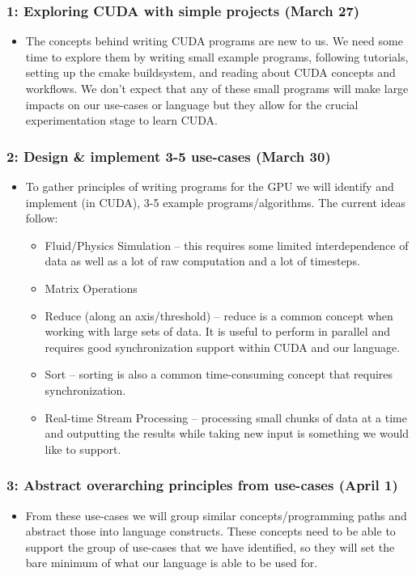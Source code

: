 \documentclass{article}
\begin{document}
\subsubsection*{1: Exploring CUDA with simple projects (March 27)}
\begin{itemize}
  \item The concepts behind writing CUDA programs are new to us. We need some time to explore them by writing small example programs, following tutorials, setting up the cmake buildsystem, and reading about CUDA concepts and workflows. We don't expect that any of these small programs will make large impacts on our use-cases or language but they allow for the crucial experimentation stage to learn CUDA.
  \end{itemize}

\subsubsection*{2: Design \& implement 3-5 use-cases (March 30)}
\begin{itemize}
  \item To gather principles of writing programs for the GPU we will identify and implement (in CUDA), 3-5 example programs/algorithms. The current ideas follow:
    \begin{itemize}
      \item Fluid/Physics Simulation -- this requires some limited interdependence of data as well as a lot of raw computation and a lot of timesteps.
      \item Matrix Operations
      \item Reduce (along an axis/threshold) -- reduce is a common concept when working with large sets of data. It is useful to perform in parallel and requires good synchronization support within CUDA and our language.
      \item Sort -- sorting is also a common time-consuming concept that requires synchronization.
      \item Real-time Stream Processing -- processing small chunks of data at a time and outputting the results while taking new input is something we would like to support.
  \end{itemize}
\end{itemize}

\subsubsection*{3: Abstract overarching principles from use-cases (April 1)}
\begin{itemize}
  \item From these use-cases we will group similar concepts/programming paths and abstract those into language constructs. These concepts need to be able to support the group of use-cases that we have identified, so they will set the bare minimum of what our language is able to be used for.
\end{itemize}
  
\end{document}
